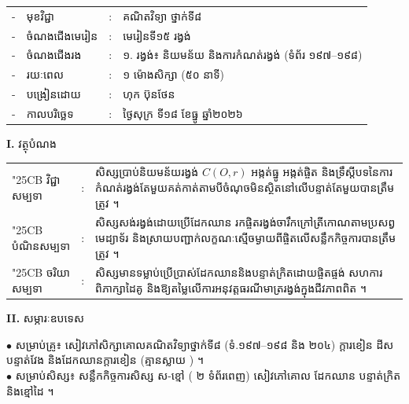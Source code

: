 \documentclass[a4paper,10pt]{article}
\newcommand{\wcirc}{{\symfont\char"25CB}}
\begin{document}
{\fontsize{10pt}{15.0pt}\selectfont
\hspace*{3.7cm}%
\begin{tabular}{@{}l l l l@{}}
  - & មុខវិជ្ជា & : & គណិតវិទ្យា ថ្នាក់ទី៨ \\
  - & ចំណងជើងមេរៀន & : & មេរៀនទី១៥ រង្វង់ \\
  - & ចំណងជើងរង & : & ១. រង្វង់៖ និយមន័យ និងការកំណត់រង្វង់ (ទំព័រ ១៩៧--១៩៨) \\
  - & រយៈពេល & : & ១ ម៉ោងសិក្សា (៥០ នាទី) \\
  - & បង្រៀនដោយ & : & ហុក ប៊ុនថែន \\
  - & កាលបរិច្ឆេទ & : & ថ្ងៃសុក្រ ទី១៨ ខែធ្នូ ឆ្នាំ២០២៦ \\
\end{tabular}

\vspace{1pt}

\textbf{I.} {\muol វត្ថុបំណង}\\[1pt]
\hspace*{0.55cm}%
\begin{tabular}{@{}l l L{14.2cm}@{}}
  \wcirc \hspace{0.25cm} វិជ្ជាសម្បទា & : & សិស្សប្រាប់និយមន័យរង្វង់ $C(O,r)$ អង្កត់ធ្នូ អង្កត់ផ្ចិត និងទ្រឹស្ដីបទនៃការកំណត់រង្វង់តែមួយគត់កាត់តាមបីចំណុចមិនស្ថិតនៅលើបន្ទាត់តែមួយបានត្រឹមត្រូវ ។ \\
  \wcirc \hspace{0.25cm} បំណិនសម្បទា & : & សិស្សសង់រង្វង់ដោយប្រើដែកឈាន រកផ្ចិតរង្វង់ចារឹកក្រៅត្រីកោណតាមប្រសព្វមេដ្យាទ័រ និងស្រាយបញ្ជាក់លក្ខណៈស្មើចម្ងាយពីផ្ចិតលើសន្លឹកកិច្ចការបានត្រឹមត្រូវ ។ \\
  \wcirc \hspace{0.25cm} ចរិយាសម្បទា & : & សិស្សមានទម្លាប់ប្រើប្រាស់ដែកឈាននិងបន្ទាត់ក្រិតដោយផ្ចិតផ្ចង់ សហការពិភាក្សាដៃគូ និងឱ្យតម្លៃលើការអនុវត្តធរណីមាត្ររង្វង់ក្នុងជីវភាពពិត ។ \\
\end{tabular}

\vspace{1pt}

\textbf{II.} {\muol សម្ភារៈឧបទេស}\\[1pt]
\hspace*{0.55cm}\parbox[t]{18.2cm}{$\bullet$ \hspace{0.25cm} សម្រាប់គ្រូ៖ សៀវភៅសិក្សាគោលគណិតវិទ្យាថ្នាក់ទី៨ (ទំ.១៩៧--១៩៨ និង ២០៤) ក្ដារខៀន ដីស បន្ទាត់វែង និងដែកឈានក្ដារខៀន (គ្មានស្លាយ ) ។\\
$\bullet$ \hspace{0.25cm} សម្រាប់សិស្ស៖ សន្លឹកកិច្ចការសិស្ស ស-ខ្មៅ ( ២ ទំព័រពេញ) សៀវភៅគោល ដែកឈាន បន្ទាត់ក្រិត និងខ្មៅដៃ ។}

}
\end{document}
